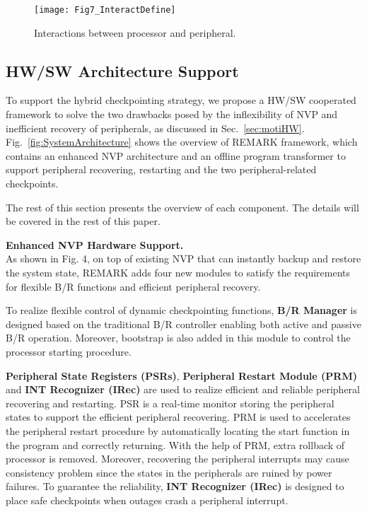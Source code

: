 %   
\begin{figure}[t]
    \centering
    \texttt{[image: Fig7\_InteractDefine]}
    \caption{Interactions between processor and peripheral.}
    \label{fig:InteractDefine}
\end{figure}

\subsection{HW/SW Architecture Support}   \label{sec:sysArch}
%
To support the hybrid checkpointing strategy, we propose a HW/SW cooperated framework to solve the two drawbacks posed by the inflexibility of NVP and inefficient recovery of peripherals, as discussed in Sec.~\ref{sec:motiHW}.
Fig.~\ref{fig:SystemArchitecture} shows the overview of REMARK framework, which contains an enhanced NVP architecture and an offline program transformer to support peripheral recovering, restarting and the two peripheral-related checkpoints.

The rest of this section presents the overview of each component.
The details will be covered in the rest of this paper. 

\noindent\textbf{Enhanced NVP Hardware Support.} \\
As shown in Fig. 4, on top of existing NVP that can instantly backup and restore the system state, REMARK adds four new modules to satisfy the requirements for flexible B/R functions and efficient peripheral recovery.

To realize flexible control of dynamic checkpointing functions, \textbf{B/R Manager} is designed based on the traditional B/R controller enabling both active and passive B/R operation.
Moreover, bootstrap is also added in this module to control the processor starting procedure.

\textbf{Peripheral State Registers (PSRs)}, \textbf{Peripheral Restart Module (PRM)} and \textbf{INT Recognizer (IRec)} are used to realize efficient and reliable peripheral recovering and restarting.
PSR is a real-time monitor storing the peripheral states to support the efficient peripheral recovering.
PRM is used to accelerates the peripheral restart procedure by automatically locating the start function in the program and correctly returning.
With the help of PRM, extra rollback of processor is removed.
Moreover, recovering the peripheral interrupts may cause consistency problem since the states in the peripherals are ruined by power failures.
To guarantee the reliability, \textbf{INT Recognizer (IRec)} is designed to place safe checkpoints when outages crash a peripheral interrupt.

